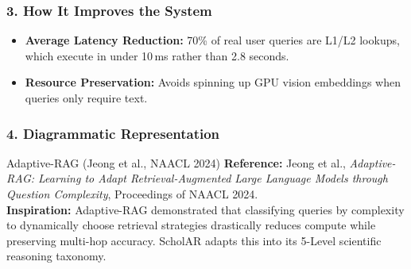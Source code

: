 \documentclass[11pt,a4paper]{article}
\begin{document}
\subsubsection{3. How It Improves the System}
\begin{itemize}[leftmargin=*]
    \item \textbf{Average Latency Reduction:} 70\% of real user queries are L1/L2 lookups, which execute in under 10\,ms rather than 2.8 seconds.
    \item \textbf{Resource Preservation:} Avoids spinning up GPU vision embeddings when queries only require text.
\end{itemize}

\subsubsection{4. Diagrammatic Representation}
\begin{center}
\end{center}

\begin{inspirationbox}{Adaptive-RAG (Jeong et al., NAACL 2024)}
\textbf{Reference:} Jeong et al., \emph{Adaptive-RAG: Learning to Adapt Retrieval-Augmented Large Language Models through Question Complexity}, Proceedings of NAACL 2024.\\
\textbf{Inspiration:} Adaptive-RAG demonstrated that classifying queries by complexity to dynamically choose retrieval strategies drastically reduces compute while preserving multi-hop accuracy. ScholAR adapts this into its 5-Level scientific reasoning taxonomy.
\end{inspirationbox}
\end{document}

